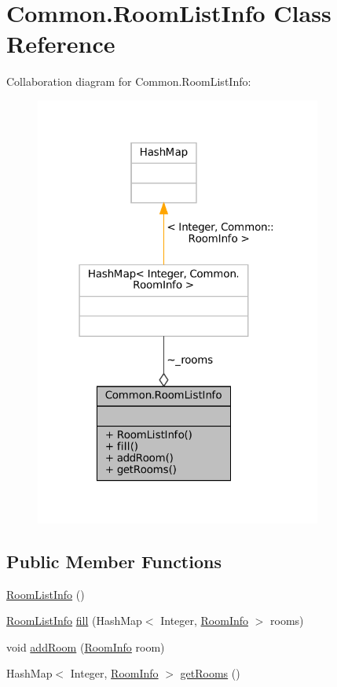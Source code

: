 \hypertarget{classCommon_1_1RoomListInfo}{}\section{Common.\+Room\+List\+Info Class Reference}
\label{classCommon_1_1RoomListInfo}


Collaboration diagram for Common.\+Room\+List\+Info\+:
\nopagebreak
\begin{figure}[H]
\begin{center}
\leavevmode
\includegraphics[width=267pt]{classCommon_1_1RoomListInfo__coll__graph}
\end{center}
\end{figure}
\subsection*{Public Member Functions}
\begin{DoxyCompactItemize}
\item 
\mbox{\hyperlink{classCommon_1_1RoomListInfo_a5541213c561f67a7f126c1cd2d70b5ad}{Room\+List\+Info}} ()
\item 
\mbox{\hyperlink{classCommon_1_1RoomListInfo}{Room\+List\+Info}} \mbox{\hyperlink{classCommon_1_1RoomListInfo_a9063826915df8bd9e411df54cca5f6f0}{fill}} (Hash\+Map$<$ Integer, \mbox{\hyperlink{classCommon_1_1RoomInfo}{Room\+Info}} $>$ rooms)
\item 
void \mbox{\hyperlink{classCommon_1_1RoomListInfo_ad177bab88940fd9d3c02d47fe791ce31}{add\+Room}} (\mbox{\hyperlink{classCommon_1_1RoomInfo}{Room\+Info}} room)
\item 
Hash\+Map$<$ Integer, \mbox{\hyperlink{classCommon_1_1RoomInfo}{Room\+Info}} $>$ \mbox{\hyperlink{classCommon_1_1RoomListInfo_a2546f4c16f204de286beae2528c2ea51}{get\+Rooms}} ()
\end{DoxyCompactItemize}


